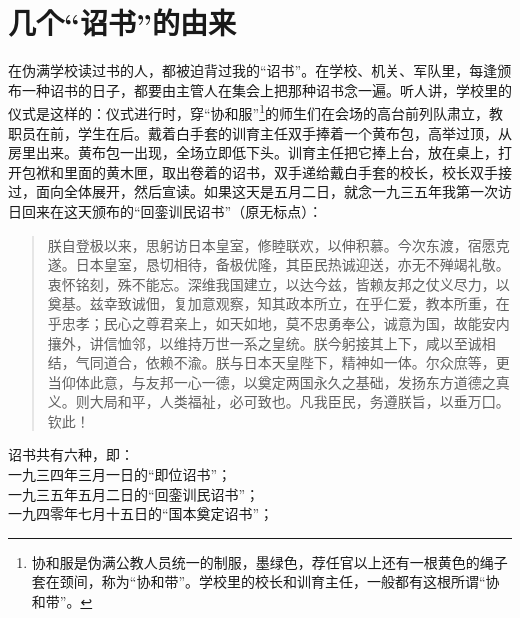 \fancyhead[RO]{} %
\fancyhead[LE]{} %
\chapter*{几个“诏书”的由来}
\thispagestyle{empty}
在伪满学校读过书的人，都被迫背过我的“诏书”。在学校、机关、军队里，每逢颁布一种诏书的日子，都要由主管人在集会上把那种诏书念一遍。听人讲，学校里的仪式是这样的：仪式进行时，穿“协和服”\footnote{协和服是伪满公教人员统一的制服，墨绿色，荐任官以上还有一根黄色的绳子套在颈间，称为“协和带”。学校里的校长和训育主任，一般都有这根所谓“协和带”。}的师生们在会场的高台前列队肃立，教职员在前，学生在后。戴着白手套的训育主任双手捧着一个黄布包，高举过顶，从房里出来。黄布包一出现，全场立即低下头。训育主任把它捧上台，放在桌上，打开包袱和里面的黄木匣，取出卷着的诏书，双手递给戴白手套的校长，校长双手接过，面向全体展开，然后宣读。如果这天是五月二日，就念一九三五年我第一次访日回来在这天颁布的“回銮训民诏书”（原无标点）：\\

\begin{quote}
	朕自登极以来，思躬访日本皇室，修睦联欢，以伸积慕。今次东渡，宿愿克遂。日本皇室，恳切相待，备极优隆，其臣民热诚迎送，亦无不殚竭礼敬。衷怀铭刻，殊不能忘。深维我国建立，以达今兹，皆赖友邦之仗义尽力，以奠基。兹幸致诚佃，复加意观察，知其政本所立，在乎仁爱，教本所重，在乎忠孝；民心之尊君亲上，如天如地，莫不忠勇奉公，诚意为国，故能安内攘外，讲信恤邻，以维持万世一系之皇统。朕今躬接其上下，咸以至诚相结，气同道合，依赖不渝。朕与日本天皇陛下，精神如一体。尔众庶等，更当仰体此意，与友邦一心一德，以奠定两国永久之基础，发扬东方道德之真义。则大局和平，人类福祉，必可致也。凡我臣民，务遵朕旨，以垂万囗。钦此！\\
\end{quote}

诏书共有六种，即：\\

一九三四年三月一日的“即位诏书”；\\

一九三五年五月二日的“回銮训民诏书”；\\

一九四零年七月十五日的“国本奠定诏书”；\\

